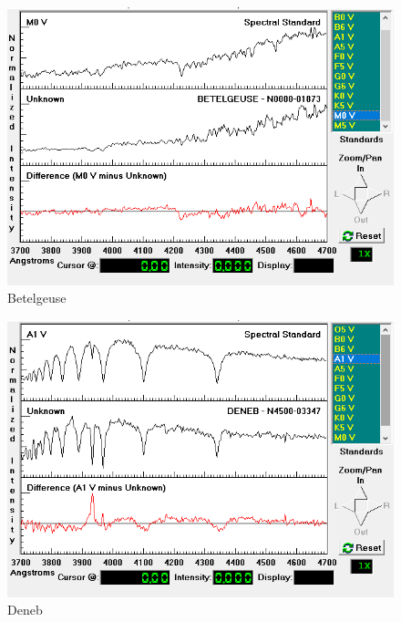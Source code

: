 \documentclass[letterpaper,11pt]{report}
\begin{document}
    \begin{figure}[H]
        \centering
        \includegraphics[scale=0.39]{Betelgeuce.png}
        \caption{Betelgeuse}
        \label{fig:my_label}
    \end{figure}
    \begin{figure}[H]
        \centering
        \includegraphics[scale=0.4]{Deneb.png}
        \caption{Deneb}
        \label{fig:my_label}
    \end{figure}
\end{document}
